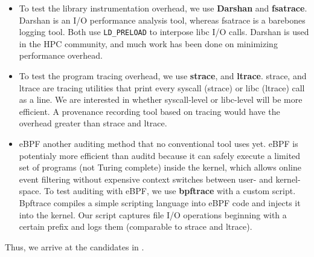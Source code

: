 \begin{itemize}
\item
To test the library instrumentation overhead, we use \textbf{Darshan} and \textbf{fsatrace}.
Darshan is an I/O performance analysis tool, whereas fsatrace is a barebones logging tool.
Both use \texttt{LD\_PRELOAD} to interpose libc I/O calls.
Darshan is used in the HPC community, and much work has been done on minimizing performance overhead.

\item
To test the program tracing overhead, we use \textbf{strace}, and \textbf{ltrace}.
strace, and ltrace are tracing utilities that print every syscall (strace) or libc (ltrace) call as a line.
We are interested in whether syscall-level or libc-level will be more efficient.
A provenance recording tool based on tracing would have the overhead greater than strace and ltrace.

\item
eBPF another auditing method that no conventional tool uses yet.
eBPF is potentialy more efficient than auditd because it can safely execute a limited set of programs (not Turing complete) inside the kernel, which allows online event filtering without expensive context switches between user- and kernel-space.
To test auditing with eBPF, we use \textbf{bpftrace} with a custom script.
Bpftrace compiles a simple scripting language into eBPF code and injects it into the kernel.
Our script captures file I/O operations beginning with a certain prefix and logs them (comparable to strace and ltrace).
\end{itemize}


Thus, we arrive at the candidates in .


